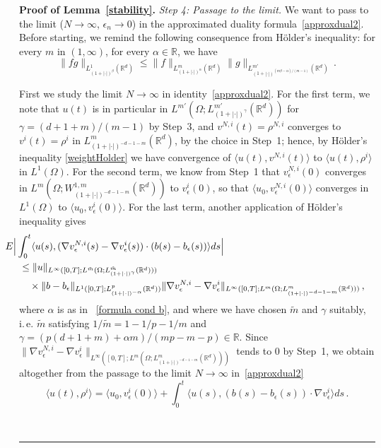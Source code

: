 \documentclass[a4paper,10pt]{article}
\newenvironment{proof}[1][Proof]{\noindent\textbf{#1.} }{\ \rule{0.5em}{0.5em}}
\newcommand{\mr}{\mathbb{R}}
\newcommand{\lan}{\langle}
\newcommand{\ran}{\rangle}
\newcommand{\td}{\tilde}
\newcommand{\eps}{\epsilon}
\begin{document}
\begin{proof}[Proof of Lemma~\ref{stability}]
\emph{Step 4: Passage to the limit.} We want to pass to the limit ($N\rightarrow\infty$, $\eps_n\rightarrow0$) in the approximated duality formula~\eqref{approxdual2}. Before starting, we remind the following consequence from H\"older's inequality: for every $m$ in $(1,\infty)$, for every $\alpha \in \mr$, we have
\begin{equation}
\|fg\|_{L^1_{(1+|\cdot|)^\beta}(\mr^d)}\le \|f\|_{L^m_{(1+|\cdot|)^\alpha}(\mr^d)}\|g\|_{L^{m'}_{(1+|\cdot|)^{(m\beta - \alpha)/(m-1)}}(\mr^d)}\,.\label{weightHolder}
\end{equation} 

First we study the limit $N \to \infty$ in identity~\eqref{approxdual2}. For the first term, we note that $u(t)$ is in particular in $L^{m'}(\Omega;L^{m'}_{(1+|\cdot|)^\gamma}(\mr^d))$ for $\gamma = (d + 1 + m)/(m-1)$ by Step~3, and $v^{N,i}(t)=\rho^{N,i}$ converges to $v^i(t)=\rho^i$ in $L^{m}_{(1+|\cdot|)^{-d-1-m}}(\mr^d)$, by the choice in Step~1; hence, by H\"older's inequality \eqref{weightHolder} we have convergence of $\lan u(t),v^{N,i}(t)\ran$ to $\lan u(t),\rho^i\ran$ in $L^1(\Omega)$. For the second term, we know from Step~1 that $v^{N,i}_\eps(0)$ converges in $L^m(\Omega;W^{1,m}_{(1+|\cdot|)^{-d-1-m}}(\mr^d))$ to $v_\eps^i(0)$, so that $\lan u_0,v^{N,i}_\eps(0)\ran$ converges in $L^1(\Omega)$ to $\lan u_0,v^{i}_\eps(0)\ran$. For the last term, another application of H\"older's inequality gives
\begin{align*}
\lefteqn{ \hspace{-0.5cm} E\Big|\int^t_0\lan u(s),(\nabla v^{N,i}_\eps(s)-\nabla v^{i}_\eps(s))\cdot(b(s)-b_\eps(s))\ran ds\Big|}\\
  &\le  \|u\|_{L^\infty([0,T];L^{\td{m}}(\Omega;L^{\td{m}}_{(1+|\cdot|)^{\gamma}}(\mr^d)))} \\ 
  & \quad {}\times \|b-b_\eps\|_{L^1([0,T];L^p_{(1+|\cdot|)^{-\alpha}}(\mr^d))}
  \|\nabla v^{N,i}_\eps-\nabla v^{i}_\eps\|_{L^\infty([0,T];L^{m}(\Omega;L^{m}_{(1+|\cdot|)^{-d-1-m}}(\mr^d)))} \,,
\end{align*}
where $\alpha$ is as in ~\eqref{formula cond b}, and where we have chosen $\td{m}$ and $\gamma$ suitably, i.\,e. $\td{m}$ satisfying $1/\td{m}=1-1/p-1/m$ and $\gamma= (p(d+1+m) + \alpha m ) /(mp - m- p) \in\mr$. Since $\|\nabla v^{N,i}_\eps-\nabla v^{i}_\eps\|_{L^\infty([0,T];L^{m}(\Omega;L^{m}_{(1+|\cdot|)^{-d-1-m}}(\mr^d)))}$ tends to $0$ by Step~1, we obtain altogether from the passage to the limit $N \to \infty$ in~\eqref{approxdual2}
\begin{equation*}
\lan u(t),\rho^i\ran= \lan u_0,v^{i}_\eps(0) \ran +\int^t_0\lan u(s),(b(s)-b_\eps(s))\cdot\nabla v^{i}_\eps \ran ds \, .
\end{equation*}


\end{proof}
\end{document}
